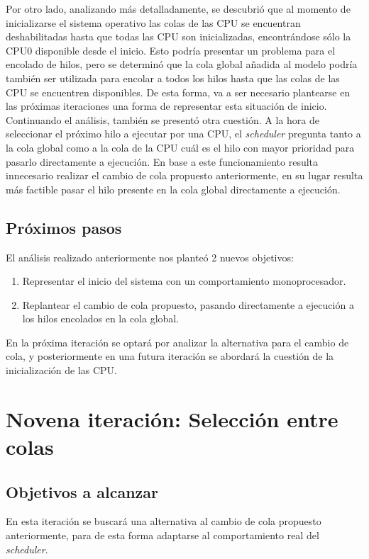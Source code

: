 \documentclass[a4paper]{book}
\begin{document}
Por otro lado, analizando m\'as detalladamente, se descubri\'o que al momento de inicializarse el sistema operativo las colas de las CPU se encuentran deshabilitadas hasta que todas las CPU son inicializadas, encontr\'andose s\'olo la CPU0 disponible desde el inicio. Esto podr\'ia presentar un problema para el encolado de hilos, pero se determin\'o que la cola global a\~nadida al modelo podr\'ia tambi\'en ser utilizada para encolar a todos los hilos hasta que las colas de las CPU se encuentren disponibles. De esta forma, va a ser necesario plantearse en las pr\'oximas iteraciones una forma de representar esta situación de inicio.\\

Continuando el an\'alisis, tambi\'en se present\'o otra cuesti\'on. A la hora de seleccionar el pr\'oximo hilo a ejecutar por una CPU, el \emph{scheduler} pregunta tanto a la cola global como a la cola de la CPU cu\'al es el hilo con mayor prioridad para pasarlo directamente a ejecuci\'on. En base a este funcionamiento resulta innecesario realizar el cambio de cola propuesto anteriormente, en su lugar resulta m\'as factible pasar el hilo presente en la cola global directamente a ejecución.

\subsection{Pr\'oximos pasos}
El an\'alisis realizado anteriormente nos plante\'o 2 nuevos objetivos:
\begin{enumerate}
\item Representar el inicio del sistema con un comportamiento monoprocesador.
\item Replantear el cambio de cola propuesto, pasando directamente a ejecuci\'on a los hilos encolados en la cola global.
\end{enumerate}
En la pr\'oxima iteraci\'on se optar\'a por analizar la alternativa para el cambio de cola, y posteriormente en una futura iteraci\'on se abordar\'a la cuesti\'on de la inicializaci\'on de las CPU.


\newpage
\section{Novena iteraci\'on: Selecci\'on entre colas}

\subsection{Objetivos a alcanzar}
En esta iteraci\'on se buscar\'a una alternativa al cambio de cola propuesto anteriormente, para de esta forma adaptarse al comportamiento real del \emph{scheduler}.
\end{document}
